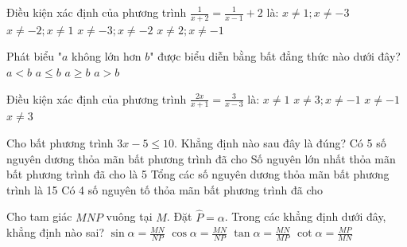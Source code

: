 \documentclass[12pt,a4paper]{article}
\begin{document}
\begin{ex}
Điều kiện xác định của phương trình $\frac{1}{x + 2} = \frac{1}{x - 1} + 2$ là:
\choice
{$x \neq 1; x \neq -3$}
{\True $x \neq -2; x \neq 1$}
{$x \neq -3; x \neq -2$}
{$x \neq 2; x \neq -1$}
\end{ex}

\begin{ex}
Phát biểu "$a$ không lớn hơn $b$" được biểu diễn bằng bất đẳng thức nào dưới đây?
\choice
{$a < b$}
{\True $a \le b$}
{$a \ge b$}
{$a > b$}
\end{ex}

\newpage
\begin{ex}
Điều kiện xác định của phương trình $\frac{2x}{x + 1} = \frac{3}{x - 3}$ là:
\choice
{$x \neq 1$}
{\True $x \neq 3; x \neq -1$}
{$x \neq -1$}
{$x \neq 3$}
\end{ex}

\begin{ex}
Cho bất phương trình $3x - 5 \le 10$. Khẳng định nào sau đây là đúng?
\choice
{Có 5 số nguyên dương thỏa mãn bất phương trình đã cho}
{Số nguyên lớn nhất thỏa mãn bất phương trình đã cho là 5}
{\True Tổng các số nguyên dương thỏa mãn bất phương trình là 15}
{Có 4 số nguyên tố thỏa mãn bất phương trình đã cho}
\end{ex}

\begin{ex}
Cho tam giác $MNP$ vuông tại $M$. Đặt $\widehat{P} = \alpha$. Trong các khẳng định dưới đây, khẳng định nào sai?
\choice
{$\sin \alpha = \frac{MN}{NP}$}
{\True $\cos \alpha = \frac{MN}{NP}$}
{$\tan \alpha = \frac{MN}{MP}$}
{$\cot \alpha = \frac{MP}{MN}$}
\end{ex}
\end{document}
